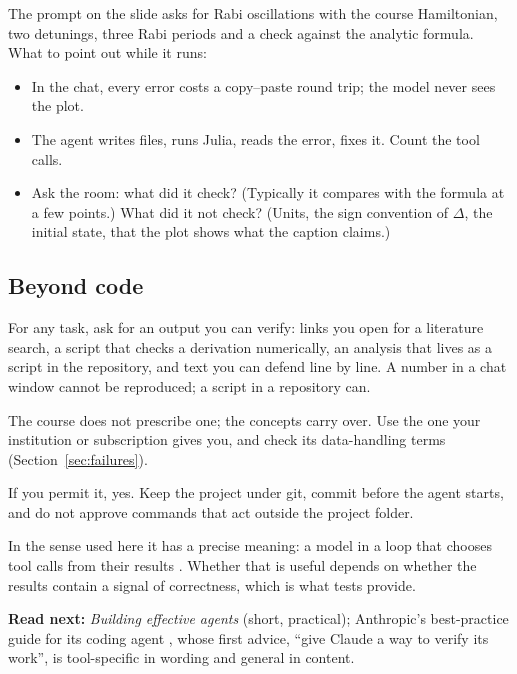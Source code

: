The prompt on the slide asks for Rabi oscillations with the course Hamiltonian, two
detunings, three Rabi periods and a check against the analytic formula. What to point out
while it runs:
\begin{itemize}
  \item In the chat, every error costs a copy--paste round trip; the model never sees the
        plot.
  \item The agent writes files, runs Julia, reads the error, fixes it. Count the tool
        calls.
  \item Ask the room: what did it check? (Typically it compares with the formula at a
        few points.) What did it not check? (Units, the sign convention of $\Delta$, the
        initial state, that the plot shows what the caption claims.)
\end{itemize}

\subsection{Beyond code}

For any task, ask for an output you can verify: links you open for a literature search, a
script that checks a derivation numerically, an analysis that lives as a script in the
repository, and text you can defend line by line. A number in a chat window cannot be
reproduced; a script in a repository can.

\begin{qa}
The course does not prescribe one; the concepts carry over. Use the one your institution
or subscription gives you, and check its data-handling terms (Section~\ref{sec:failures}).

If you permit it, yes. Keep the project under git, commit before the agent starts, and do
not approve commands that act outside the project folder.

In the sense used here it has a precise meaning: a model in a loop that chooses tool
calls from their results . Whether that is useful depends on whether the
results contain a signal of correctness, which is what tests provide.
\end{qa}

\textbf{Read next:} \emph{Building effective agents}  (short, practical);
Anthropic's best-practice guide for its coding agent , whose first advice,
``give Claude a way to verify its work'', is tool-specific in wording and general in
content.
